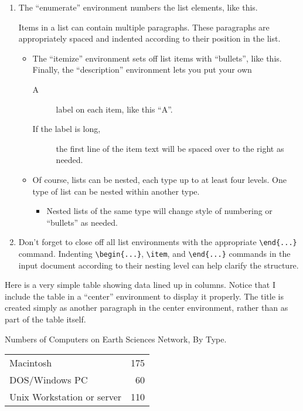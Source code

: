 \documentclass[12pt]{article}
\theoremstyle{definition}
\begin{document}
\begin{enumerate}
\item 
The ``enumerate'' environment numbers the list elements, like this.

Items in a list can contain multiple paragraphs.
These paragraphs are appropriately spaced and indented according to their
position in the list.
  \begin{itemize}
  \item The ``itemize'' environment sets off list items with ``bullets'',
like this. Finally, the ``description'' environment lets you put your own
    \begin{description}
    \item[A] label on each item, like this ``A''.
    \item[If the label is long,] the first line of the item text will
be spaced over to the right as needed.
    \end{description}
    
      \item Of course, lists can be nested, each type up to at least four levels.
One type of list can be nested within another type.
    \begin{itemize}
    \item Nested lists of the same type will change style of numbering 
or ``bullets'' as needed.
   \end{itemize}
  \end{itemize}
\item Don't forget to close off all list environments with the 
appropriate \verb+\end{...}+ command.
Indenting \verb+\begin{...}+, \verb+\item+, and \verb+\end{...}+
commands in the input document according to their nesting level can help 
clarify the structure.
\end{enumerate}
Here is a very simple table showing data lined up in columns.
Notice that I include the table in a ``center'' environment to display
it properly.
The title is created simply as another paragraph in the center environment,
rather than as part of the table itself.
\begin{center}
Numbers of Computers on Earth Sciences Network, By Type.

\begin{tabular}{lr}
Macintosh&175\\
DOS/Windows PC&60\\
Unix Workstation or server&110\\
\end{tabular}
\end{center}
\end{document}
